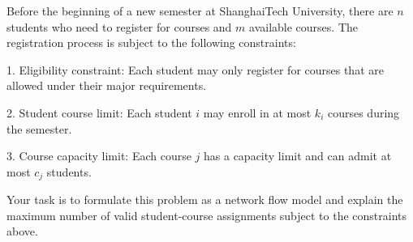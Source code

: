 \problem{}
Before the beginning of a new semester at ShanghaiTech University, there are \(n\) students who need to register for courses and \(m\) available courses. The registration process is subject to the following constraints:

1. Eligibility constraint: Each student may only register for courses that are allowed under their major requirements.

2. Student course limit: Each student \(i\) may enroll in at most \(k_i\) courses during the semester.

3. Course capacity limit: Each course \(j\) has a capacity limit and can admit at most \(c_j\) students.

Your task is to formulate this problem as a network flow model and explain the maximum number of valid student-course assignments subject to the constraints above.

\solution{
}
\newpage